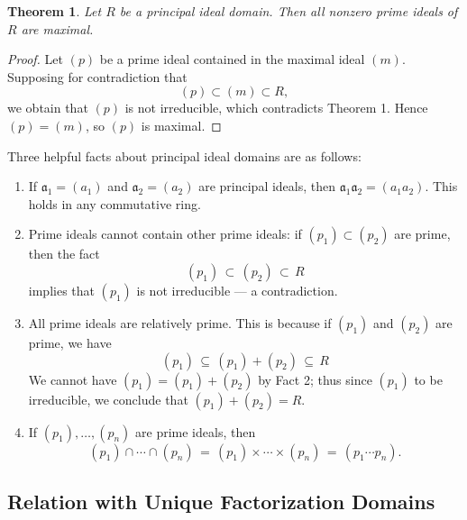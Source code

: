 \documentclass[11pt]{article}
\newtheorem{theorem}{Theorem}
\begin{document}
\begin{adjustwidth}{0.5cm}{}
	\begin{theorem}
		Let $R$ be a principal ideal domain. Then all nonzero prime ideals of $R$ are maximal.
	\end{theorem}
	\begin{proof}
    Let $(p)$ be a prime ideal contained in the maximal ideal $(m)$. Supposing for contradiction that
    \[
      (p) \subset (m) \subset R,
    \]
    we obtain that $(p)$ is not irreducible, which contradicts Theorem 1. Hence $(p) = (m)$, so $(p)$ is maximal.
	\end{proof}
\end{adjustwidth}
Three helpful facts about principal ideal domains are as follows:
\begin{enumerate}
  \item If $\mathfrak{a}_{1} = (a_{1})$ and $\mathfrak{a}_{2} = (a_{2})$ are principal ideals, then $\mathfrak{a}_{1} \mathfrak{a}_{2} = (a_{1}a_{2})$. This holds in any commutative ring.
  \item Prime ideals cannot contain other prime ideals: if $(p_{1}) \subset (p_{2})$ are prime, then the fact
  \[
    (p_{1}) \, \subset \, (p_{2}) \, \subset \, R
  \]
  implies that $(p_{1})$ is not irreducible --- a contradiction.
  \item All prime ideals are relatively prime. This is because if $(p_{1})$ and $(p_{2})$ are prime, we have
  \[
    (p_{1}) \, \subseteq \, (p_{1}) + (p_{2}) \, \subseteq \, R
  \]
  We cannot have $(p_{1}) = (p_{1}) + (p_{2})$ by Fact 2; thus since $(p_{1})$ to be irreducible, we conclude that $(p_{1}) + (p_{2}) = R$.
  \item If $(p_{1}), \ldots, (p_{n})$ are prime ideals, then
  \[
    (p_{1}) \cap \cdots \cap (p_{n}) \, = \, (p_{1}) \times \cdots \times (p_{n}) \, = \, (p_{1} \cdots p_{n}).
  \]
\end{enumerate}


\subsection{Relation with Unique Factorization Domains}
\end{document}
